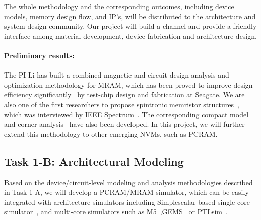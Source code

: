 The whole methodology and the corresponding outcomes, including device models, memory design flow, and IP's, will be distributed to the architecture and system design community. Our project will build a channel and provide a friendly interface among material development, device fabrication and architecture design.

\paragraph{Preliminary results:} The PI Li has built a combined magnetic and circuit design analysis and optimization methodology for MRAM, which has been proved to improve design efficiency significantly~\cite{Chen08} by test-chip design and fabrication at Seagate. We are also one of the first researchers to propose spintronic memristor structures~\cite{Wang09}, which was interviewed by IEEE Spectrum~\cite{Spectrum09}. The corresponding compact model and corner analysis~\cite{Chen09} have also been developed. In this project, we will further extend this methodology to other emerging NVMs, such as PCRAM.


\subsection{Task 1-B: Architectural Modeling}

Based on the device/circuit-level modeling and analysis methodologies described in Task 1-A, we will develop a PCRAM/MRAM simulator, which can be easily integrated with architecture simulators including Simplescalar-based single core simulator~\cite{simplescalar:computer02,sim-alpha}, and multi-core simulators such as M5~\cite{3D:M5},GEMS~\cite{martin:can05} or PTLsim~\cite{PTLsim}.

